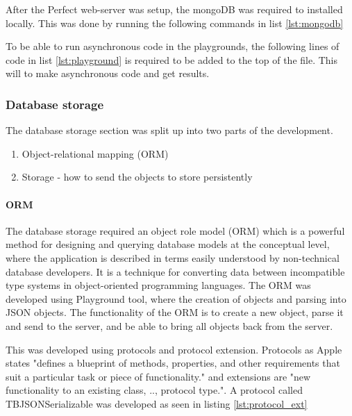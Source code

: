 After the Perfect web-server was setup, the mongoDB was required to installed locally. This was done by running the following commands in list \ref{lst:mongodb}






To be able to run asynchronous code in the playgrounds, the following lines of code in list \ref{lst:playground} is required to be added to the top of the file. This will to make asynchronous code and get results.

\subsubsection{Database storage}

The database storage section was split up into two parts of the development. 

\begin{enumerate}
  \item Object-relational mapping (ORM)
  \item Storage - how to send the objects to store persistently
\end{enumerate}

\paragraph{ORM}

The database storage required an object role model (ORM) which is a powerful method for designing and querying database models at the conceptual level, where the application is described in terms easily understood by non-technical database developers. It is a technique for converting data between incompatible type systems in object-oriented programming languages. The ORM was developed using Playground tool, where the creation of objects and parsing into JSON objects. The functionality of the ORM is to create a new object, parse it and send to the server, and be able to bring all objects back from the server.

This was developed using protocols and protocol extension. Protocols as Apple states "defines a blueprint of methods, properties, and other requirements that suit a particular task or piece of functionality." and extensions are "new functionality to an existing class, .., protocol type.". \cite{protocol} A protocol called TBJSONSerializable was developed as seen in listing \ref{lst:protocol_ext}

